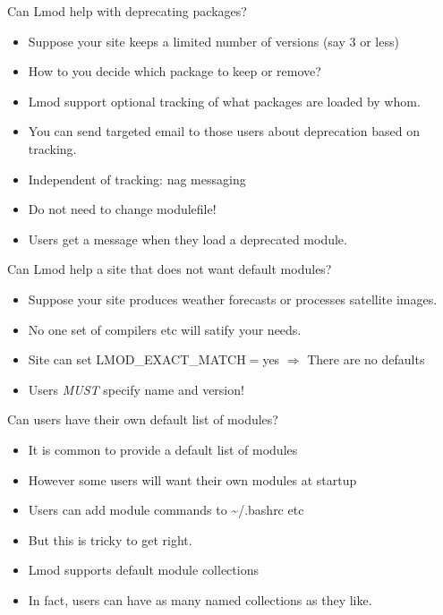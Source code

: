 \documentclass{beamer}
\begin{document}
\begin{frame}{Can Lmod help with deprecating packages?}
  \begin{itemize}
    \item Suppose your site keeps a limited number of versions (say 3
      or less)
    \item How to you decide which package to keep or remove?
    \item Lmod support optional tracking of what packages are loaded
      by whom.
    \item You can send targeted email to those users about
      deprecation based on tracking.
    \item Independent of tracking: nag messaging
    \item Do not need to change modulefile!
    \item Users get a message when they load a deprecated module. 
  \end{itemize}
\end{frame}

\begin{frame}{Can Lmod help a site that does not want default modules?}
  \begin{itemize}
    \item Suppose your site produces weather forecasts or processes
      satellite images.
    \item No one set of compilers etc will satify your needs.
    \item Site can set LMOD\_EXACT\_MATCH$=$yes $\Rightarrow$ There are no defaults
    \item Users \emph{MUST} specify name and version!
  \end{itemize}
\end{frame}

\begin{frame}{Can users have their own default list of modules?}
  \begin{itemize}
    \item It is common to provide a default list of modules
    \item However some users will want their own modules at startup
    \item Users can add module commands to \textasciitilde/.bashrc etc
    \item But this is tricky to get right.
    \item Lmod supports default module collections
    \item In fact, users can have as many named collections as they like.
  \end{itemize}
\end{frame}
\end{document}
